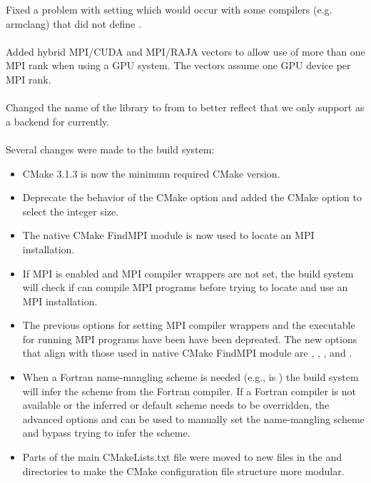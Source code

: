 Fixed a problem with setting  which would occur
with some compilers (e.g. armclang) that did not define .
\\
\\
\noindent Added hybrid MPI/CUDA and MPI/RAJA vectors to allow use of more 
than one MPI rank when using a GPU system.  The vectors assume one GPU 
device per MPI rank.
\\
\\
\noindent Changed the name of the {\raja} {\nvector} library to
 from \newline
{} to better reflect that we only support {\cuda}
as a backend for {\raja} currently.
\\
\\
\noindent Several changes were made to the build system:
\begin{itemize}
\item CMake 3.1.3 is now the minimum required CMake version.
\item Deprecate the behavior of the  CMake option and
  added the \newline 
   CMake option to select the 
  integer size.
\item The native CMake FindMPI module is now used to locate an MPI installation.
\item If MPI is enabled and MPI compiler wrappers are not set, the build system 
  will check if  can compile MPI programs before
  trying to locate and use an MPI installation.
\item The previous options for setting MPI compiler wrappers and the executable
  for running MPI programs have been have been depreated. The new options that
  align with those used in native CMake FindMPI module are
  , , ,
  and .
\item When a Fortran name-mangling scheme is needed (e.g., 
  is ) the build system will infer the scheme from the Fortran
  compiler. If a Fortran compiler is not available or the inferred or default
  scheme needs to be overridden, the advanced options
   and  can
  be used to manually set the name-mangling scheme and bypass trying to infer
  the scheme. 
\item Parts of the main CMakeLists.txt file were moved to new files in the
   and  directories to make the CMake configuration file
  structure more modular.
\end{itemize}

